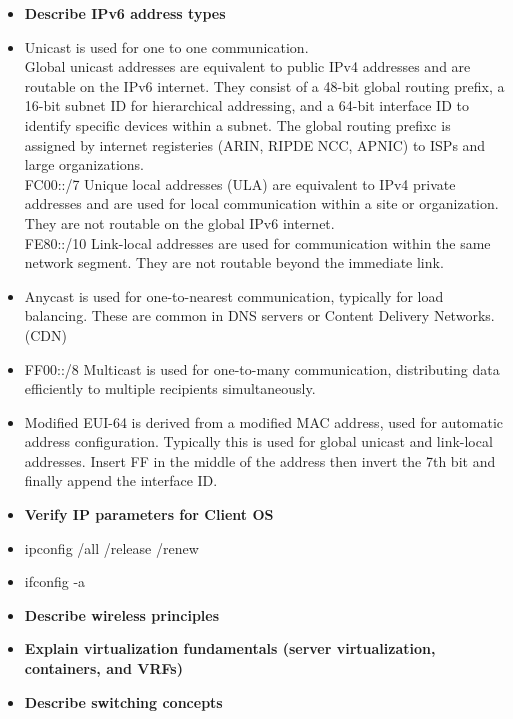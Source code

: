 \documentclass{article}
\begin{document}
\begin{itemize}
  \item \textbf{Describe IPv6 address types}
  	\item[] Unicast is used for one to one communication.\\
		Global unicast addresses are equivalent to public IPv4 addresses and are routable on the IPv6 internet. They consist of a 48-bit global routing prefix, a 16-bit subnet ID for hierarchical addressing, and a 64-bit interface ID to identify specific devices within a subnet. The global routing prefixc is assigned by internet registeries (ARIN, RIPDE NCC, APNIC) to ISPs and large organizations.\\
		FC00::/7 Unique local addresses (ULA) are equivalent to IPv4 private addresses and are used for local communication within a site or organization. They are not routable on the global IPv6 internet.\\
		FE80::/10 Link-local addresses are used for communication within the same network segment. They are not routable beyond the immediate link. \\
	\item[] Anycast is used for one-to-nearest communication, typically for load balancing. These are common in DNS servers or Content Delivery Networks. (CDN)\\
	\item[] FF00::/8 Multicast is used for one-to-many communication, distributing data efficiently to multiple recipients simultaneously.\\
	\item[] Modified EUI-64 is derived from a modified MAC address, used for automatic address configuration. Typically this is used for global unicast and link-local addresses. Insert FF in the middle of the address then invert the 7th bit and finally append the interface ID.\\
  
  \item \textbf{Verify IP parameters for Client OS}
  	\item[] ipconfig /all /release /renew
  	\item[] ifconfig -a
  
  \item \textbf{Describe wireless principles}
  
  \item \textbf{Explain virtualization fundamentals (server virtualization, containers, and VRFs)}
  
  \item \textbf{Describe switching concepts}
\end{itemize}
\end{document}
